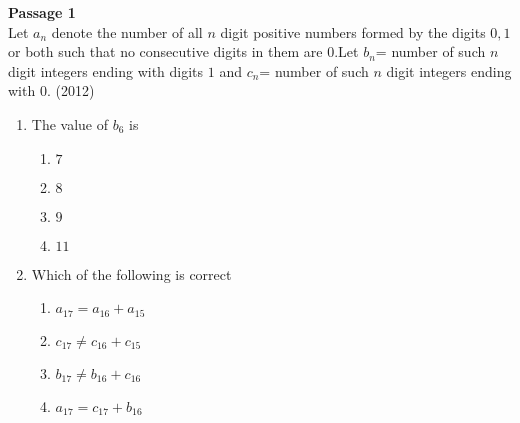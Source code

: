   \iffalse
  \title{Assignment}
  \author{Banapuram Pranay Kumar}
  \section{paragraph}
  \fi




 \item \textbf{ Passage 1}\\
Let $a_n$ denote the number of all $n$ digit positive numbers formed by the digits $0,1$ or both such that no consecutive digits in them are $0$.Let $b_n$= number of such $n$ digit integers ending with digits $1$ and $c_n$= number of such $n$ digit integers ending with $0$.
\hfill (2012)
\begin{enumerate}
    \item The value of $b_6$ is
    \begin{enumerate}
        \item $7$ 
        \item $8$
        \item $9$
        \item $11$
    \end{enumerate}
    \item Which of the following is correct
    \begin{enumerate}
        \item $a_{17}=a_{16}+a_{15}$     
        \item $c_{17}\neq c_{16}+c_{15}$
        \item $b_{17} \neq b_{16}+c_{16}$
        \item $a_{17}=c_{17}+b_{16}$  \\[30pt]
    \end{enumerate}
    \end{enumerate}
